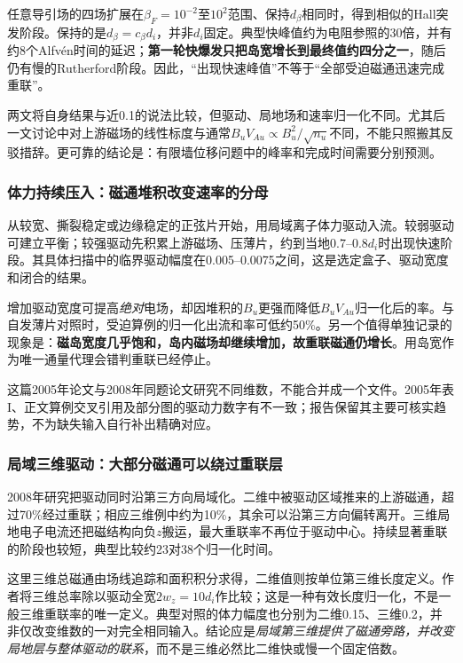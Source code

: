 任意导引场的四场扩展在$\beta_F=10^{-2}$至$10^2$范围、保持$d_\beta$相同时，得到相似的Hall突发阶段。保持的是$d_\beta=c_\beta d_i$，并非$d_i$固定。典型快峰值约为电阻参照的30倍，并有约8个Alfvén时间的延迟；\textbf{第一轮快爆发只把岛宽增长到最终值约四分之一}，随后仍有慢的Rutherford阶段。因此，“出现快速峰值”不等于“全部受迫磁通迅速完成重联”。\citep{L058}

两文将自身结果与近0.1的说法比较，但驱动、局地场和速率归一化不同。尤其后一文讨论中对上游磁场的线性标度与通常$B_uV_{Au}\propto B_u^2/\sqrt{n_u}$不同，不能只照搬其反驳措辞。更可靠的结论是：有限墙位移问题中的峰率和完成时间需要分别预测。

\subsubsection{体力持续压入：磁通堆积改变速率的分母}
\citet{L076}从较宽、撕裂稳定或边缘稳定的正弦片开始，用局域离子体力驱动入流。较弱驱动可建立平衡；较强驱动先积累上游磁场、压薄片，约到当地$0.7$--$0.8d_i$时出现快速阶段。其具体扫描中的临界驱动幅度在0.005--0.0075之间，这是选定盒子、驱动宽度和闭合的结果。

增加驱动宽度可提高\emph{绝对}电场，却因堆积的$B_u$更强而降低$B_uV_{Au}$归一化后的率。与自发薄片对照时，受迫算例的归一化出流和率可低约50\%。另一个值得单独记录的现象是：\textbf{磁岛宽度几乎饱和，岛内磁场却继续增加，故重联磁通仍增长}。用岛宽作为唯一通量代理会错判重联已经停止。

这篇2005年论文与2008年同题论文研究不同维数，不能合并成一个文件。2005年表I、正文算例交叉引用及部分图的驱动力数字有不一致；报告保留其主要可核实趋势，不为缺失输入自行补出精确对应。

\subsubsection{局域三维驱动：大部分磁通可以绕过重联层}
2008年研究把驱动同时沿第三方向局域化。二维中被驱动区域推来的上游磁通，超过70\%经过重联；相应三维例中约为10\%，其余可以沿第三方向偏转离开。三维局地电子电流还把磁结构向负$z$搬运，最大重联率不再位于驱动中心。持续显著重联的阶段也较短，典型比较约23对38个归一化时间。\citep{F717}

这里三维总磁通由场线追踪和面积积分求得，二维值则按单位第三维长度定义。作者将三维总率除以驱动全宽$2w_z=10d_i$作比较；这是一种有效长度归一化，不是一般三维重联率的唯一定义。典型对照的体力幅度也分别为二维0.15、三维0.2，并非仅改变维数的一对完全相同输入。结论应是\emph{局域第三维提供了磁通旁路，并改变局地层与整体驱动的联系}，而不是三维必然比二维快或慢一个固定倍数。

